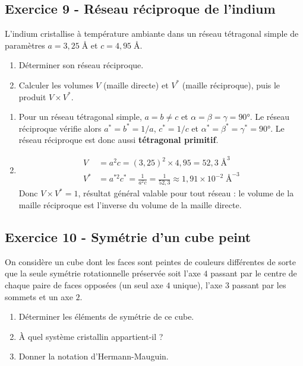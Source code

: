 \documentclass[12pt,a4paper]{article}
\begin{document}
\subsection*{Exercice 9 - Réseau réciproque de l'indium \niveau{\moyen}}

\begin{boiteexercice}
\niveau{\moyen}
L'indium cristallise à température ambiante dans un réseau tétragonal simple de paramètres $a=3{,}25\;\text{\AA}$ et $c=4{,}95\;\text{\AA}$.
\begin{enumerate}
  \item Déterminer son réseau réciproque.
  \item Calculer les volumes $V$ (maille directe) et $V^*$ (maille réciproque), puis le produit $V\times V^*$.
\end{enumerate}
\end{boiteexercice}

\begin{boitecorrige}
\begin{enumerate}
\item Pour un réseau tétragonal simple, $a=b\neq c$ et $\alpha=\beta=\gamma=90°$. Le réseau réciproque vérifie alors $a^*=b^*=1/a$, $c^*=1/c$ et $\alpha^*=\beta^*=\gamma^*=90°$. Le réseau réciproque est donc aussi \textbf{tétragonal primitif}.

\item
\begin{align*}
V &= a^2c = (3{,}25)^2\times 4{,}95 = 52{,}3\;\text{\AA}^3\\
V^* &= a^{*2}c^* = \frac{1}{a^2c} = \frac{1}{52{,}3} \approx 1{,}91\times10^{-2}\;\text{\AA}^{-3}
\end{align*}
Donc $V\times V^* = 1$, résultat général valable pour tout réseau :
le volume de la maille réciproque est l'inverse du volume de la maille directe.
\end{enumerate}
\end{boitecorrige}

\subsection*{Exercice 10 - Symétrie d'un cube peint \niveau{\moyen}}

\begin{boiteexercice}
\niveau{\moyen}
On considère un cube dont les faces sont peintes de couleurs différentes de sorte que la seule symétrie rotationnelle préservée soit l'axe $4$ passant par le centre de chaque paire de faces opposées (un seul axe $4$ unique), l'axe $3$ passant par les sommets et un axe $2$.
\begin{enumerate}
  \item Déterminer les éléments de symétrie de ce cube.
  \item À quel système cristallin appartient-il ?
  \item Donner la notation d'Hermann-Mauguin.
\end{enumerate}
\end{boiteexercice}
\end{document}
